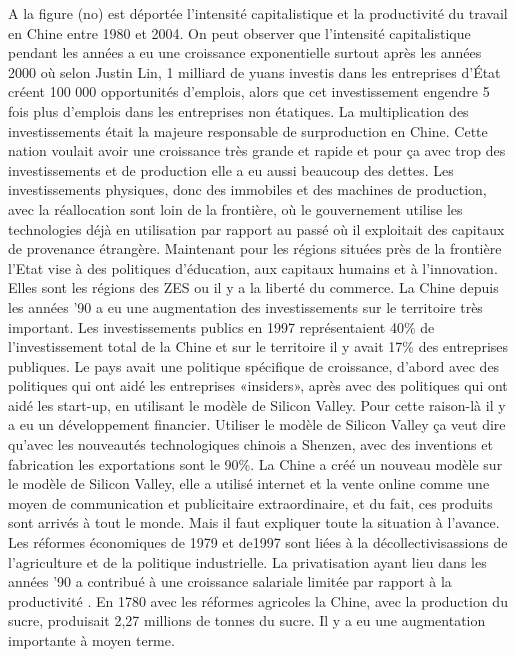 A la figure (no) est déportée l’intensité capitalistique et la productivité du travail en Chine entre 1980 et 2004. On peut observer que l’intensité capitalistique pendant les années a eu une croissance exponentielle surtout après les années 2000 où selon Justin Lin, 1 milliard de yuans investis dans les entreprises d’État créent 100 000 opportunités d’emplois, alors que cet investissement engendre 5 fois plus d’emplois dans les entreprises non étatiques.  La multiplication des investissements était la majeure responsable de surproduction en Chine.  Cette nation voulait avoir une croissance très grande et rapide et pour ça avec trop des investissements et de production elle a eu aussi beaucoup des dettes.
Les investissements physiques, donc des immobiles et des machines de production, avec la réallocation sont loin de la frontière, où le gouvernement utilise les technologies déjà en utilisation par rapport au passé où il exploitait des capitaux de provenance étrangère. Maintenant pour les régions situées près de la frontière l’Etat vise à des politiques d’éducation, aux capitaux humains et à l’innovation. Elles sont les régions des ZES ou il y a la liberté du commerce.
La Chine depuis les années ’90 a eu une augmentation des investissements sur le territoire très important. Les investissements publics en 1997 représentaient 40\% de l’investissement total de la Chine et sur le territoire il y avait 17\% des entreprises publiques. Le pays avait une politique spécifique de croissance, d’abord avec des politiques qui ont aidé les entreprises «insiders», après avec des politiques qui ont aidé les start-up, en utilisant le modèle de Silicon Valley. Pour cette raison-là il y a eu un développement financier.
Utiliser le modèle de Silicon Valley ça veut dire qu’avec les nouveautés technologiques chinois a Shenzen, avec des inventions et fabrication les exportations sont le 90\%. La Chine a créé un nouveau modèle sur le modèle de Silicon Valley, elle a utilisé internet et la vente online comme une moyen de communication et publicitaire extraordinaire, et du fait, ces produits sont arrivés à tout le monde. 
Mais il faut expliquer toute la situation à l’avance.
Les réformes économiques de 1979 et de1997 sont liées à la décollectivisassions de l’agriculture et de la politique industrielle. La privatisation ayant lieu dans les années ’90 a contribué à une croissance salariale limitée par rapport à la productivité . 
En 1780 avec les réformes agricoles la Chine, avec la production du sucre, produisait 2,27 millions de tonnes du sucre. Il y a eu une augmentation importante à moyen terme.

